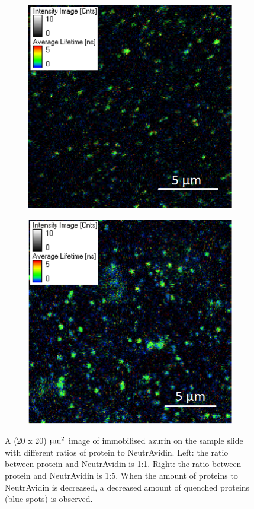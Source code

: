 \documentclass[twoside,single]{lion-msc}
\begin{document}
\begin{figure}
\begin{subfigure}{.5\textwidth}
  \centering
  \includegraphics[width=.95 \linewidth]{onetooneratio}
  \label{}
\end{subfigure}%
\begin{subfigure}{.5\textwidth}
  \centering
  \includegraphics[width=.95 \linewidth]{onetofive}
  \label{}
\end{subfigure}
\caption{A (20 x 20) $\upmu \textup{m}^{2}$ image of immobilised azurin on the sample slide with different ratios of protein to NeutrAvidin. Left: the ratio between protein and NeutrAvidin is 1:1. Right: the ratio between protein and NeutrAvidin is 1:5. When the amount of proteins to NeutrAvidin is decreased, a decreased amount of quenched proteins (blue spots) is observed.}
\label{finding_proteins}
\end{figure}
\end{document}
